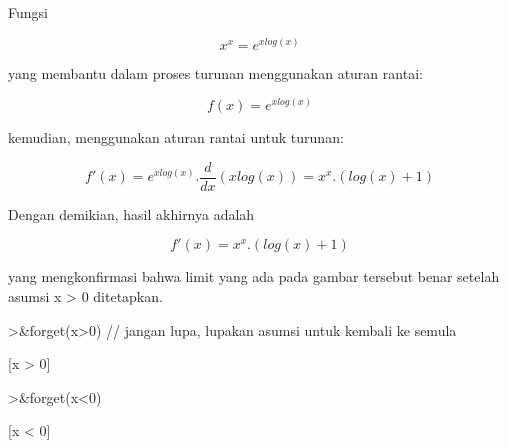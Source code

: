 \documentclass[a4paper,10pt]{article}
\begin{document}
\begin{eulernotebook}
\begin{eulercomment}
\begin{eulercomment}
\begin{eulercomment}
\begin{eulercomment}
\begin{eulercomment}
\begin{eulercomment}
\begin{eulercomment}
\begin{eulercomment}
\begin{eulercomment}
\begin{eulercomment}
\begin{eulercomment}
\begin{eulercomment}
\begin{eulercomment}
\begin{eulercomment}
\begin{eulercomment}
\begin{eulercomment}
\begin{eulercomment}
\begin{eulercomment}
\begin{eulercomment}
\begin{eulercomment}
\begin{eulercomment}
\begin{eulercomment}
\begin{eulercomment}
Fungsi\\
\end{eulercomment}
\begin{eulerformula}
\[
x^x = e^{x log (x)}
\]
\end{eulerformula}
\begin{eulercomment}
yang membantu dalam proses turunan menggunakan aturan rantai:\\
\end{eulercomment}
\begin{eulerformula}
\[
f(x)=e^{x log (x)}
\]
\end{eulerformula}
\begin{eulercomment}
kemudian, menggunakan aturan rantai untuk turunan:\\
\end{eulercomment}
\begin{eulerformula}
\[
f'(x)=e^{x log (x)}.\frac{d}{dx}(x log(x))=x^x.(log(x)+1)
\]
\end{eulerformula}
\begin{eulercomment}
Dengan demikian, hasil akhirnya adalah\\
\end{eulercomment}
\begin{eulerformula}
\[
f'(x)=x^x.(log(x)+1)
\]
\end{eulerformula}
\begin{eulercomment}
yang mengkonfirmasi bahwa limit yang ada pada gambar tersebut benar
setelah asumsi x \textgreater{} 0 ditetapkan.
\end{eulercomment}
\begin{eulerprompt}
>&forget(x>0) // jangan lupa, lupakan asumsi untuk kembali ke semula
\end{eulerprompt}
\begin{euleroutput}
  
                                 [x > 0]
  
\end{euleroutput}
\begin{eulerprompt}
>&forget(x<0)
\end{eulerprompt}
\begin{euleroutput}
  
                                 [x < 0]
  

\end{euleroutput}
\end{eulercomment}
\end{eulercomment}
\end{eulercomment}
\end{eulercomment}
\end{eulercomment}
\end{eulercomment}
\end{eulercomment}
\end{eulercomment}
\end{eulercomment}
\end{eulercomment}
\end{eulercomment}
\end{eulercomment}
\end{eulercomment}
\end{eulercomment}
\end{eulercomment}
\end{eulercomment}
\end{eulercomment}
\end{eulercomment}
\end{eulercomment}
\end{eulercomment}
\end{eulercomment}
\end{eulercomment}
\end{eulernotebook}
\end{document}
